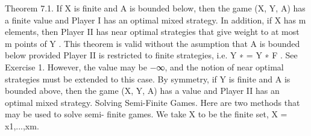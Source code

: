 \documentclass[]{report}
\begin{document}
Theorem 7.1. If X is finite and A is bounded below, then the game (X, Y, A) has a finite
value and Player I has an optimal mixed strategy. In addition, if X has m elements, then
Player II has near optimal strategies that give weight to at most m points of Y .
This theorem is valid without the asumption that A is bounded below provided Player
II is restricted to finite strategies, i.e. Y ∗ = Y ∗
F . See Exercise 1. However, the value may
be −∞, and the notion of near optimal strategies must be extended to this case.
By symmetry, if Y is finite and A is bounded above, then the game (X, Y, A) has a
value and Player II has an optimal mixed strategy.
Solving Semi-Finite Games. Here are two methods that may be used to solve semi-
finite games. We take X to be the finite set, X = {x1,...,xm}.
\end{document}
